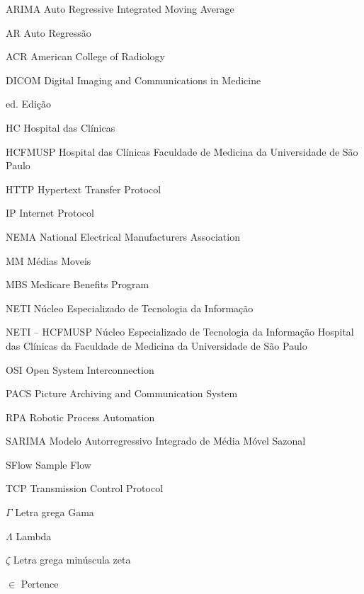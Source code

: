 \documentclass[
	12pt,				%
	openright,			%
	twoside,			%
	a4paper,			%
	english,			%
	french,				%
	spanish,			%
	brazil				%
	]{abntex2}
\begin{document}

\listoffigures*
\cleardoublepage

\listoftables*
\cleardoublepage

\begin{siglas}
\item[ARIMA] Auto Regressive Integrated Moving Average
\item[AR] Auto Regressão
\item[ACR] American College of Radiology
\item[DICOM] Digital Imaging and Communications in Medicine
\item[ed.] Edição
\item[HC] Hospital das Clínicas
\item[HCFMUSP] Hospital das Clínicas Faculdade de Medicina da Universidade de São Paulo
\item[HTTP] Hypertext Transfer Protocol 
\item[IP] Internet Protocol
\item[NEMA] National Electrical Manufacturers Association
\item[MM] Médias Moveis
\item[MBS] Medicare Benefits Program
\item[NETI] Núcleo Especializado de Tecnologia da Informação
\item[NETI – HCFMUSP] Núcleo Especializado de Tecnologia da Informação Hospital das Clínicas da Faculdade de Medicina da Universidade de São Paulo
\item[OSI] Open System Interconnection
\item[PACS] Picture Archiving and Communication System
\item[RPA] Robotic Process Automation
\item[SARIMA] Modelo Autorregressivo Integrado de Média Móvel Sazonal
\item[SFlow] Sample Flow
\item[TCP] Transmission Control Protocol
\end{siglas}

\begin{simbolos}
  \item[$ \Gamma $] Letra grega Gama
  \item[$ \Lambda $] Lambda
  \item[$ \zeta $] Letra grega minúscula zeta
  \item[$ \in $] Pertence
\end{simbolos}
\end{document}
